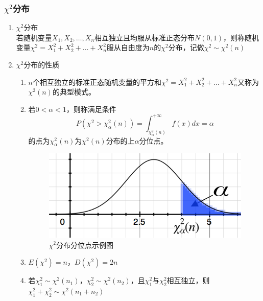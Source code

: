 \subsubsection{$\chi^2$分布}
\begin{enumerate}
	\item $\chi^2$分布 \\
	若随机变量$X_1, X_2, \dots, X_n$相互独立且均服从标准正态分布$N(0,1)$，则称随机变量$\chi^2 = X_1^2+X_2^2+\dots+X_n^2$服从自由度为$n$的$\chi^2$分布，记做$\chi^2 \sim \chi^2(n)$
	\item $\chi^2$分布的性质 \\
	\begin{enumerate}
		\item $n$个相互独立的标准正态随机变量的平方和$\chi^2 = X_1^2+X_2^2+\dots+X_n^2$又称为$\chi^2(n)$的典型模式。
		\item 若$0<\alpha<1$，则称满足条件
		\begin{equation}
			P(\chi^2 > \chi_{\alpha}^{2}(n)) = \int_{\chi_{\alpha}^{2}(n)}^{+\infty}f(x)dx = \alpha
		\end{equation}
		的点为$\chi_{\alpha}^{2}(n)$为$\chi^2(n)$分布的上$\alpha$分位点。
		\begin{figure}[htbp]
			\centering
			\includegraphics[scale=0.9]{contents/分位点}
			\caption{$\chi^2$分布分位点示例图}
		\end{figure}
		\item $E(\chi^2) = n$，$D(\chi^2)=2n$
		\item 若$\chi_1^2 \sim \chi^2(n_1)$，$\chi_2^2 \sim \chi^2(n_2)$，且$\chi_1^2$与$\chi_2^2$相互独立，则$\chi_1^2 + \chi_2^2 \sim \chi^2(n_1+n_2)$
	\end{enumerate}
\end{enumerate}

